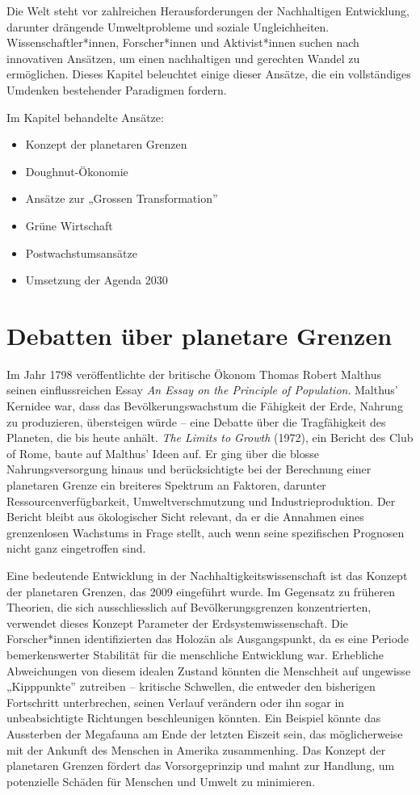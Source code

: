 \documentclass[
  nswissgerman,
  a4paper,
  openany]{book}
\begin{document}
Die Welt steht vor zahlreichen Herausforderungen der Nachhaltigen
Entwicklung, darunter drängende Umweltprobleme und soziale
Ungleichheiten. Wissenschaftler*innen, Forscher*innen und Aktivist*innen
suchen nach innovativen Ansätzen, um einen nachhaltigen und gerechten
Wandel zu ermöglichen. Dieses Kapitel beleuchtet einige dieser Ansätze,
die ein vollständiges Umdenken bestehender Paradigmen fordern.

Im Kapitel behandelte Ansätze:

\begin{itemize}
\item
  Konzept der planetaren Grenzen
\item
  Doughnut-Ökonomie
\item
  Ansätze zur „Grossen Transformation''
\item
  Grüne Wirtschaft
\item
  Postwachstumsansätze
\item
  Umsetzung der Agenda 2030
\end{itemize}

\section{Debatten über planetare
Grenzen}\label{debatten-uxfcber-planetare-grenzen}

Im Jahr 1798 veröffentlichte der britische Ökonom Thomas Robert Malthus
seinen einflussreichen Essay \emph{An Essay on the Principle of
Population}. Malthus' Kernidee war, dass das Bevölkerungswachstum die
Fähigkeit der Erde, Nahrung zu produzieren, übersteigen würde -- eine
Debatte über die Tragfähigkeit des Planeten, die bis heute anhält.
\emph{The Limits to Growth} (1972), ein Bericht des Club of Rome, baute
auf Malthus' Ideen auf. Er ging über die blosse Nahrungsversorgung
hinaus und berücksichtigte bei der Berechnung einer planetaren Grenze
ein breiteres Spektrum an Faktoren, darunter Ressourcenverfügbarkeit,
Umweltverschmutzung und Industrieproduktion. Der Bericht bleibt aus
ökologischer Sicht relevant, da er die Annahmen eines grenzenlosen
Wachstums in Frage stellt, auch wenn seine spezifischen Prognosen nicht
ganz eingetroffen sind.

Eine bedeutende Entwicklung in der Nachhaltigkeitswissenschaft ist das
Konzept der planetaren Grenzen, das 2009 eingeführt wurde. Im Gegensatz
zu früheren Theorien, die sich ausschliesslich auf Bevölkerungsgrenzen
konzentrierten, verwendet dieses Konzept Parameter der
Erdsystemwissenschaft. Die Forscher*innen identifizierten das Holozän
als Ausgangspunkt, da es eine Periode bemerkenswerter Stabilität für die
menschliche Entwicklung war. Erhebliche Abweichungen von diesem idealen
Zustand könnten die Menschheit auf ungewisse „Kipppunkte'' zutreiben --
kritische Schwellen, die entweder den bisherigen Fortschritt
unterbrechen, seinen Verlauf verändern oder ihn sogar in unbeabsichtigte
Richtungen beschleunigen könnten. Ein Beispiel könnte das Aussterben der
Megafauna am Ende der letzten Eiszeit sein, das möglicherweise mit der
Ankunft des Menschen in Amerika zusammenhing. Das Konzept der planetaren
Grenzen fördert das Vorsorgeprinzip und mahnt zur Handlung, um
potenzielle Schäden für Menschen und Umwelt zu minimieren.
\end{document}
